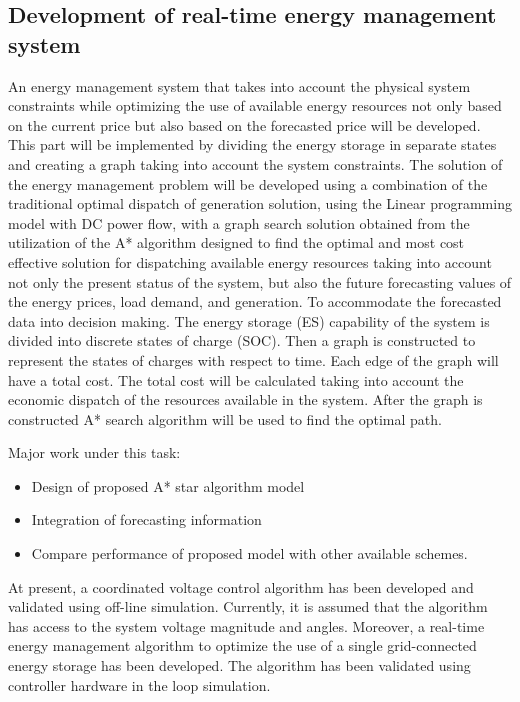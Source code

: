 \subsection{Development of real-time energy management system}
An energy management system that takes into account the physical system constraints while optimizing the use of available energy resources not only based on the current price but also based on the forecasted price will be developed. This part will be implemented by dividing the energy storage in separate states and creating a graph taking into account the system constraints. The solution of the energy management problem will be developed using a combination of the traditional optimal dispatch of generation solution, using the Linear programming model with DC power flow, with a graph search solution obtained from the utilization of the A* algorithm designed to find the optimal and most cost effective solution for dispatching available energy resources taking into account not only the present status of the system, but also the future forecasting values of the energy prices, load demand, and generation.
To accommodate the forecasted data into decision making. The energy storage (ES) capability of the system is divided into discrete states of charge (SOC). Then a graph is constructed to represent the states of charges with respect to time. Each edge of the graph will have a total cost. The total cost will be calculated taking into account the economic dispatch of the resources available in the system. After the graph is constructed A* search algorithm will be used to find the optimal path.

Major work under this task:
\begin{itemize}
    \item Design of proposed A* star algorithm model 
    \item Integration of forecasting information
    \item Compare performance of proposed model with other available schemes.
\end{itemize}


At present, a coordinated voltage control algorithm has been developed and validated using off-line simulation. Currently, it is assumed that the algorithm has access to the system voltage magnitude and angles. Moreover, a real-time energy management algorithm to optimize the use of a single grid-connected energy storage has been developed. The algorithm has been validated using controller hardware in the loop simulation.